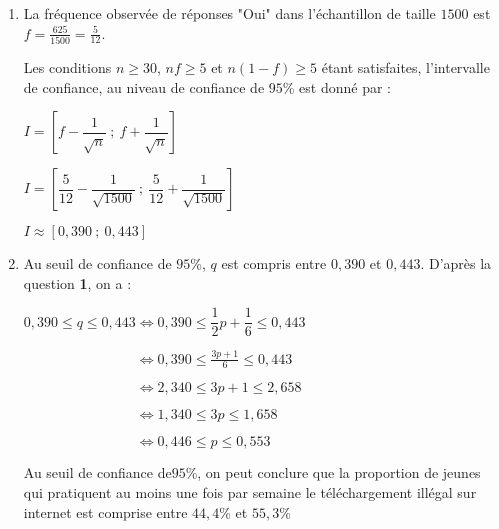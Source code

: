 \begin{corrige}
\begin{enumerate}
          \begin{enumerate}[label=\alph*.]
               \item
               La fréquence observée de réponses "Oui" dans l'échantillon de taille $1500$ est $f = \frac{625}{1500} = \frac{5}{12}$.
               \par
               Les conditions $n \geqslant 30$, $nf \geqslant 5$ et $n(1-f) \geqslant 5$ étant satisfaites, l'intervalle de confiance, au niveau de confiance de $95$\% est donné par :
               \par
               $I=\left[f-\dfrac{1}{\sqrt{n}}~;~ f+\dfrac{1}{\sqrt{n}}\right]$
               \par
               $I=\left[\dfrac{5}{12}-\dfrac{1}{\sqrt{1500}}~;~ \dfrac{5}{12}+\dfrac{1}{\sqrt{1500}}\right]$
               \par
               $I \approx [0,390~;~0,443]$
               \item
               Au seuil de confiance de $95$\%, $q$ est compris entre $0,390$ et $0,443$. D'après la question \textbf{1}, on a :
               \par
               $0,390 \leqslant q \leqslant 0,443 \Leftrightarrow 0,390 \leqslant \dfrac{1}{2}p+\dfrac{1}{6} \leqslant 0,443$
               \par
               $\phantom{0,390 \leqslant q \leqslant 0,443 }\Leftrightarrow   0,390 \leqslant \frac{3p+1}{6} \leqslant 0,443 $
               \par
               $\phantom{0,390 \leqslant q \leqslant 0,443 }\Leftrightarrow 2,340 \leqslant 3p+1 \leqslant 2,658 $
               \par
               $\phantom{0,390 \leqslant q \leqslant 0,443 }\Leftrightarrow 1,340 \leqslant 3p \leqslant 1,658$
               \par
               $\phantom{0,390 \leqslant q \leqslant 0,443 }\Leftrightarrow  0,446 \leqslant p \leqslant 0,553 $
               \par
               Au seuil de confiance de$95$\%, on peut conclure que la proportion de jeunes qui pratiquent au moins une fois par semaine le téléchargement illégal sur internet est comprise entre $44,4$\% et $55,3$\%
          \end{enumerate}
     \end{enumerate}
\end{corrige}
